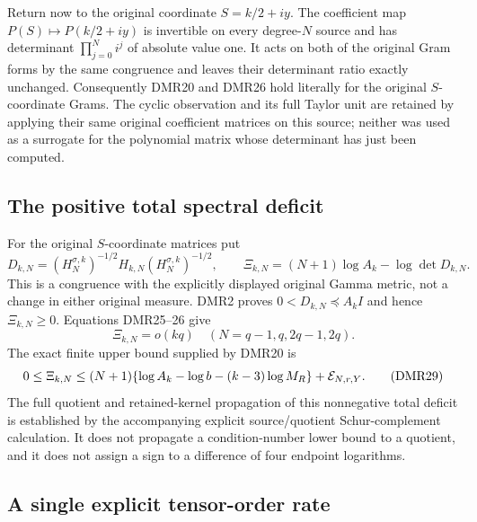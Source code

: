 \documentclass[11pt,a4paper]{article}
\begin{document}
Return now to the original coordinate $S=k/2+iy$.
The coefficient map $P(S)\mapsto P(k/2+iy)$ is invertible
on every degree-$N$ source and has determinant
$\prod_{j=0}^Ni^j$ of absolute value one. It acts on both
of the original Gram forms by the same congruence and
leaves their determinant ratio exactly unchanged.
Consequently DMR20 and DMR26 hold literally for the
original $S$-coordinate Grams. The cyclic observation
and its full Taylor unit are retained by applying their
same original coefficient matrices on this source;
neither was used as a surrogate for the polynomial
matrix whose determinant has just been computed.

\subsection{The positive total spectral deficit}

For the original $S$-coordinate matrices put
\[
 D_{k,N}=(H_N^{\sigma,k})^{-1/2}H_{k,N}
                              (H_N^{\sigma,k})^{-1/2},\qquad
 \Xi_{k,N}=(N+1)\log A_k-\log\det D_{k,N}.
 \tag{DMR27}
\]
This is a congruence with the explicitly displayed original
Gamma metric, not a change in either original measure.
DMR2 proves $0<D_{k,N}\preceq A_k I$ and hence
$\Xi_{k,N}\geq0$. Equations DMR25--26 give
\[
 \boxed{\quad \Xi_{k,N}=o(kq)\quad
       (N=q-1,q,2q-1,2q).\quad}
 \tag{DMR28}
\]
The exact finite upper bound supplied by DMR20 is
\[
 0\leq\Xi_{k,N}
  \leq(N+1)\{\log A_k-\log b-(k-3)\log M_R\}
                          +{\cal E}_{N,r,Y}.
 \tag{DMR29}
\]
The full quotient and retained-kernel propagation of this
nonnegative total deficit is established by the accompanying
explicit source/quotient Schur-complement calculation.
It does not propagate a condition-number lower bound to
a quotient, and it does not assign a sign to a difference
of four endpoint logarithms.

\subsection{A single explicit tensor-order rate}
\end{document}
